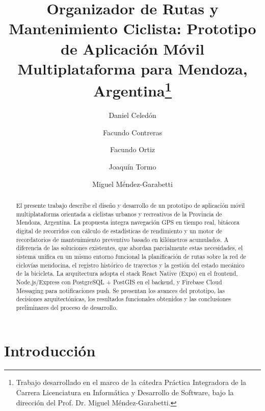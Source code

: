 \documentclass{llncs}
\begin{document}
\title{Organizador de Rutas y Mantenimiento Ciclista: Prototipo de Aplicación Móvil Multiplataforma para Mendoza, Argentina\thanks{Trabajo desarrollado en el marco de la cátedra Práctica Integradora de la Carrera Licenciatura en Informática y Desarrollo de Software, bajo la dirección del Prof. Dr. Miguel Méndez-Garabetti.}}

\author{Daniel Celedón \and Facundo Contreras \and Facundo Ortiz \and Joaquín Tormo \and Miguel Méndez-Garabetti}


\maketitle
\pagestyle{empty}
\thispagestyle{empty}

\begin{abstract}
El presente trabajo describe el diseño y desarrollo de un prototipo de aplicación móvil multiplataforma orientada a ciclistas urbanos y recreativos de la Provincia de Mendoza, Argentina. La propuesta integra navegación GPS en tiempo real, bitácora digital de recorridos con cálculo de estadísticas de rendimiento y un motor de recordatorios de mantenimiento preventivo basado en kilómetros acumulados. A diferencia de las soluciones existentes, que abordan parcialmente estas necesidades, el sistema unifica en un mismo entorno funcional la planificación de rutas sobre la red de ciclovías mendocina, el registro histórico de trayectos y la gestión del estado mecánico de la bicicleta. La arquitectura adopta el stack React Native (Expo) en el frontend, Node.js/Express con PostgreSQL + PostGIS en el backend, y Firebase Cloud Messaging para notificaciones push. Se presentan los avances del prototipo, las decisiones arquitectónicas, los resultados funcionales obtenidos y las conclusiones preliminares del proceso de desarrollo.

\end{abstract}

\section{Introducción}
\end{document}
